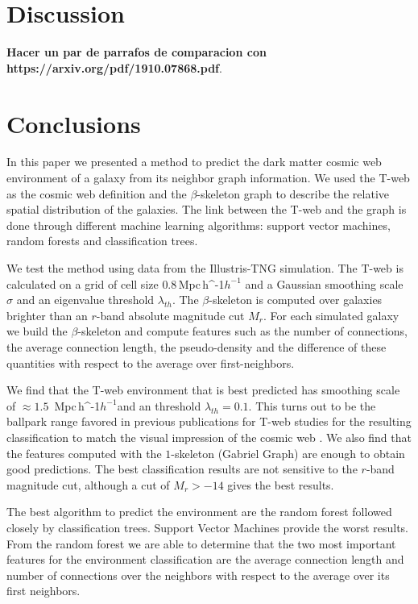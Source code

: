 \documentclass[usenatbib]{mnras}
\newcommand{\Mpch}{\,{\rm Mpc}\,\ifmmode h^{-1}\else $h^{-1}$\fi}
\begin{document}
\section{Discussion}

{\bf Hacer un par de parrafos de comparacion con
  https://arxiv.org/pdf/1910.07868.pdf}. 

\section{Conclusions}\label{sec:conclusions}

In this paper we presented a method to predict the dark matter cosmic web
environment of a galaxy from its neighbor graph information.
We used the T-web as the cosmic web definition \citep{Forero-Romero2009}
and the $\beta$-skeleton graph \citep{Fang2019} 
to describe the relative spatial distribution of the galaxies. 
The link between the T-web and the graph is done through different
machine learning algorithms: support vector machines, random forests and
classification trees.

We test the method using data from the Illustris-TNG simulation.
The T-web is calculated on a grid of cell size $0.8$\Mpch 
and a Gaussian smoothing scale $\sigma$ and an eigenvalue threshold $\lambda_{th}$.
The $\beta$-skeleton is computed over galaxies brighter than 
an $r$-band absolute magnitude cut $M_{r}$.
For each simulated galaxy we build the $\beta$-skeleton and
compute features such as the number of connections, the average connection
length, the pseudo-density and the difference of these quantities with
respect to the average over first-neighbors.

We find that the T-web environment that is best predicted has smoothing
scale of $\approx1.5$ \Mpch and an threshold $\lambda_{th}=0.1$. 
This turns out to be the ballpark range favored in previous publications
for T-web  studies for the resulting classification to match the visual impression of the cosmic web \citep{Forero-Romero2009}.
We also find that the features computed with the $1$-skeleton 
(Gabriel Graph) are enough to obtain good predictions. 
The best classification results are not sensitive to the $r$-band
magnitude cut, although a cut of $M_r>-14$ gives the best results.

The best algorithm to predict the environment are the random forest followed closely by classification trees. 
Support Vector Machines provide the worst results.
From the random forest we are able to determine that the two most
important features for the environment classification are the average connection length and number of connections over the neighbors with respect to the average over its first neighbors.
\end{document}
